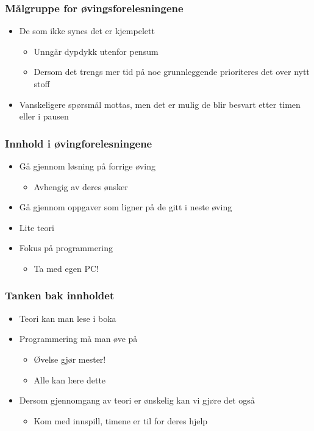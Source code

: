 \documentclass[screen, aspectratio=169]{beamer}
\begin{document}
\begin{frame}
	\frametitle{Målgruppe for øvingsforelesningene}
	\begin{itemize}
		\item De som ikke synes det er kjempelett
		\begin{itemize}
			\item Unngår dypdykk utenfor pensum
			\item Dersom det trengs mer tid på noe grunnleggende prioriteres det over nytt stoff
		\end{itemize}
		\item Vanskeligere spørsmål mottas, men det er mulig de blir besvart etter timen eller i pausen
	\end{itemize}
\end{frame}

\begin{frame}
	\frametitle{Innhold i øvingforelesningene}
	\begin{itemize}
		\item Gå gjennom løsning på forrige øving
		\begin{itemize}
			\item Avhengig av deres ønsker
		\end{itemize}
		\item Gå gjennom oppgaver som ligner på de gitt i neste øving
		\item Lite teori
		\item Fokus på programmering
		\begin{itemize}
			\item Ta med egen PC!
		\end{itemize}
	\end{itemize}
\end{frame}

\begin{frame}
	\frametitle{Tanken bak innholdet}
	\begin{itemize}
		\item Teori kan man lese i boka
		\item Programmering må man øve på
		\begin{itemize}
			\item Øvelse gjør mester!
			\item Alle kan lære dette
		\end{itemize}
		\item Dersom gjennomgang av teori er ønskelig kan vi gjøre det også
		\begin{itemize}
			\item Kom med innspill, timene er til for deres hjelp
		\end{itemize}
	\end{itemize}
\end{frame}
\end{document}

